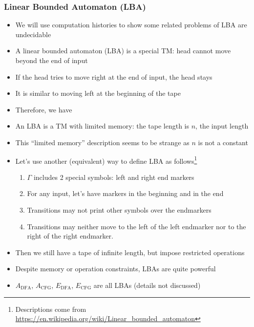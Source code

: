 \begin{frame}[allowframebreaks] \frametitle{Linear Bounded Automaton (LBA)}
  \begin{itemize}
  \item We will use computation histories to show some related
    problems of LBA are undecidable
  \item A linear bounded automaton (LBA) is
    a special TM:
head cannot move beyond the end of input
\item If the head tries to move right at the end
  of input, the head stays
\item It is similar to moving left at the beginning of the
  tape
\item Therefore, we have
  \begin{center}
\end{center}
  
\item An LBA is a TM with limited memory: the tape length is $n$, the input length
\item This ``limited memory'' description seems to be strange as $n$ is not a constant
\item Let's use another (equivalent) way to define LBA
  as follows\footnote{Descriptions come from \url{https://en.wikipedia.org/wiki/Linear_bounded_automaton}}
  \begin{enumerate}
  \item $\Gamma$ includes 2 special symbols: left and right
    end markers
  \item For any input, let's have markers in the beginning and in
    the end
  \item Transitions may not print other symbols over the endmarkers
  \item Transitions may neither move to the left of the left endmarker nor to the right of the right endmarker.
  \end{enumerate}
\item Then we still have a tape of infinite length, but impose
  restricted operations
\item Despite memory or operation constraints, LBAs are quite powerful
\item $A_{\text{DFA}}$, $A_{\text{CFG}}$, $E_{\text{DFA}}$, $E_{\text{CFG}}$
  are all LBAs (details not discussed)
\end{itemize}\end{frame} 

